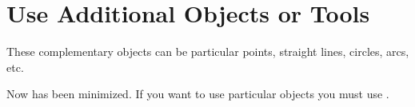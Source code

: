 \section{Use Additional Objects or Tools}

These complementary objects can be particular points, straight lines, circles,
arcs, etc.

Now \tkzname{\tkznameofpack} has been minimized. If you want to use particular
objects you must use .

\endinput
